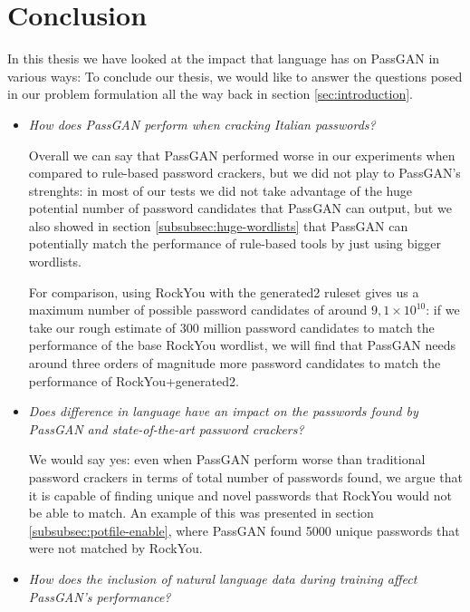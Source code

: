 \section{Conclusion}
In this thesis we have looked at the impact that language has on PassGAN in various ways:
To conclude our thesis, we would like to answer the questions posed in our problem formulation all the way back in section \ref{sec:introduction}.

\begin{itemize}
\item \emph{How does PassGAN perform when cracking Italian passwords?} %

Overall we can say that PassGAN performed worse in our experiments when compared to rule-based password crackers, but we did not play to PassGAN's strenghts: in most of our tests we did not take advantage of the huge potential number of password candidates that PassGAN can output, but we also showed in section \ref{subsubsec:huge-wordlists} that PassGAN can potentially match the performance of rule-based tools by just using bigger wordlists. 

For comparison, using RockYou with the generated2 ruleset gives us a maximum number of possible password candidates of around $9,1\times10^{10}$: if we take our rough estimate of 300 million password candidates to match the performance of the base RockYou wordlist, we will find that PassGAN needs around three orders of magnitude more password candidates to match the performance of RockYou+generated2.   


\item \emph{Does difference in language have an impact on the passwords found by PassGAN and state-of-the-art password crackers?}

We would say yes: even when PassGAN perform worse than traditional password crackers in terms of total number of passwords found, we argue that it is capable of finding unique and novel passwords that RockYou would not be able to match. An example of this was presented in section \ref{subsubsec:potfile-enable}, where PassGAN found 5000 unique passwords that were not matched by RockYou.      

\item \emph{How does the inclusion of natural language data during training affect PassGAN's performance?}


\end{itemize}
